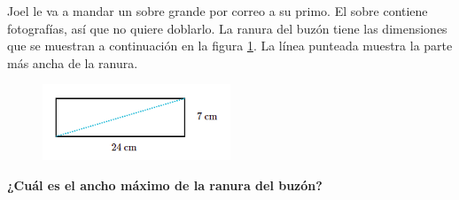 \question[15]  Joel le va a mandar un sobre grande por correo a su primo. El sobre contiene fotografías, así que no quiere doblarlo.
La ranura del buzón tiene las dimensiones que se muestran a continuación en la figura \ref{fig:proverb_pitagoras_02}. La línea punteada muestra la parte más ancha de la ranura.
\begin{figure}[H]
    \begin{center}
        \includegraphics[width=0.5\textwidth]{../images/proverb_pitagoras_02.png}
    \end{center}
    \caption{}
    \label{fig:proverb_pitagoras_02}
\end{figure}
\textbf{¿Cuál es el ancho máximo de la ranura del buzón?}